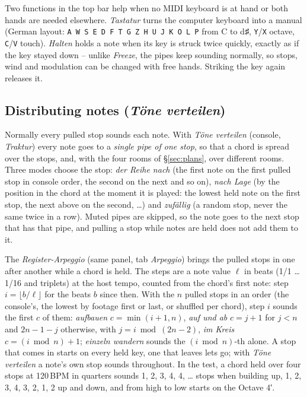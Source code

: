 \documentclass[11pt,a4paper,parskip=half,DIV=11,toc=bibliography]{scrartcl}
\newcommand{\ui}[1]{\emph{#1}}                 %
\newcommand{\code}[1]{\texttt{#1}}
\begin{document}
Two functions in the top bar help when no MIDI keyboard is at hand or both hands are needed elsewhere.
\ui{Tastatur} turns the computer keyboard into a manual (German layout: \code{A W S E D F T G Z H U J K O
L P} from C to d♯, \code{Y}/\code{X} octave, \code{C}/\code{V} touch). \ui{Halten} holds a note when its key
is struck twice quickly, exactly as if the key stayed down -- unlike \ui{Freeze}, the pipes keep sounding
normally, so stops, wind and modulation can be changed with free hands. Striking the key again releases it.

\subsection{Distributing notes (\ui{Töne verteilen})}
\label{sec:spread}
Normally every pulled stop sounds each note. With \ui{Töne verteilen} (console, \ui{Traktur}) every note goes to
a \emph{single pipe of one stop}, so that a chord is spread over the stops, and, with the four rooms of
\S\ref{sec:plans}, over different rooms. Three modes choose the stop: \ui{der Reihe nach} (the first note on the first
pulled stop in console order, the second on the next and so on), \ui{nach Lage} (by the position in the chord at the
moment it is played: the lowest held note on the first stop, the next above on the second, \dots) and
\ui{zufällig} (a random stop, never the same twice in a row). Muted pipes are skipped, so the note goes to the next stop
that has that pipe, and pulling a stop while notes are held does not add them to it.

The \ui{Register-Arpeggio} (same panel, tab \ui{Arpeggio}) brings the pulled stops in one after another while a chord is
held. The steps are a note value $\ell$ in beats (1/1 \ldots{} 1/16 and triplets) at the host tempo, counted from the chord's
first note: step $i = \lfloor b/\ell \rfloor$ for the beats $b$ since then. With the $n$ pulled stops in an order (the console's,
the lowest by footage first or last, or shuffled per chord), step $i$ sounds the first $c$ of them: \ui{aufbauen} $c = \min(i+1, n)$,
\ui{auf und ab} $c = j+1$ for $j < n$ and $2n-1-j$ otherwise, with $j = i \bmod (2n-2)$, \ui{im Kreis} $c = (i \bmod n) + 1$;
\ui{einzeln wandern} sounds the $(i \bmod n)$-th alone. A stop that comes in starts on every held key, one that leaves lets go;
with \ui{Töne verteilen} a note's own stop sounds throughout. In the test, a chord held over four stops at 120\,BPM in quarters
sounds 1, 2, 3, 4, 4, \ldots{} stops when building up, 1, 2, 3, 4, 3, 2, 1, 2 up and down, and from high to low starts on the
Octave 4′.
\end{document}
